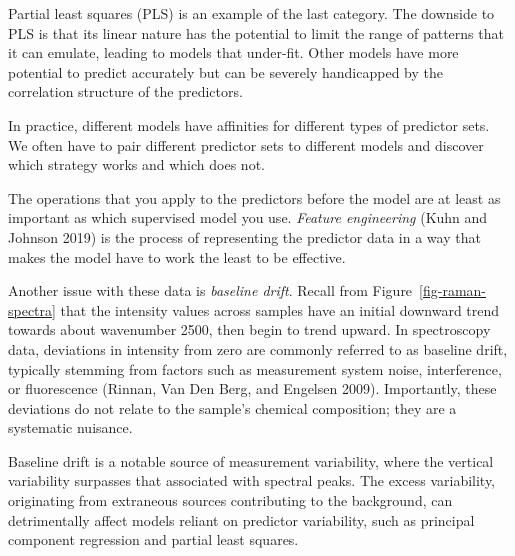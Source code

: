 \documentclass[
  letterpaper,
  DIV=11,
  numbers=noendperiod]{scrartcl}
\begin{document}
Partial least squares (PLS) is an example of the last category. The
downside to PLS is that its linear nature has the potential to limit the
range of patterns that it can emulate, leading to models that under-fit.
Other models have more potential to predict accurately but can be
severely handicapped by the correlation structure of the predictors.

In practice, different models have affinities for different types of
predictor sets. We often have to pair different predictor sets to
different models and discover which strategy works and which does not.

\begin{tcolorbox}[enhanced jigsaw, title=\textcolor{quarto-callout-important-color}{\faExclamation}\hspace{0.5em}{\textbf{WTF} \#8}, rightrule=.15mm, leftrule=.75mm, bottomtitle=1mm, opacityback=0, opacitybacktitle=0.6, bottomrule=.15mm, arc=.35mm, colframe=quarto-callout-important-color-frame, breakable, toprule=.15mm, toptitle=1mm, colback=white, titlerule=0mm, coltitle=black, left=2mm, colbacktitle=quarto-callout-important-color!10!white]

The operations that you apply to the predictors before the model are at
least as important as which supervised model you use. \emph{Feature
engineering} (Kuhn and Johnson 2019) is the process of representing the
predictor data in a way that makes the model have to work the least to
be effective.

\end{tcolorbox}

Another issue with these data is \emph{baseline drift}. Recall from
Figure~\ref{fig-raman-spectra} that the intensity values across samples
have an initial downward trend towards about wavenumber 2500, then begin
to trend upward. In spectroscopy data, deviations in intensity from zero
are commonly referred to as baseline drift, typically stemming from
factors such as measurement system noise, interference, or fluorescence
(Rinnan, Van Den Berg, and Engelsen 2009). Importantly, these deviations
do not relate to the sample's chemical composition; they are a
systematic nuisance.

Baseline drift is a notable source of measurement variability, where the
vertical variability surpasses that associated with spectral peaks. The
excess variability, originating from extraneous sources contributing to
the background, can detrimentally affect models reliant on predictor
variability, such as principal component regression and partial least
squares.
\end{document}
